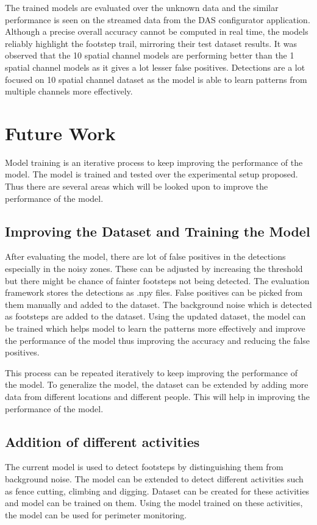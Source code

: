 The trained models are evaluated over the unknown data and the similar performance is seen on the streamed data from the DAS configurator application. Although a precise overall accuracy cannot be computed in real time, the models reliably highlight the footstep trail, mirroring their test dataset results. It was observed that the 10 spatial channel models are performing better than the 1 spatial channel models as it gives a lot lesser false positives. Detections are a lot focused on 10 spatial channel dataset as the model is able to learn patterns from multiple channels more effectively.

\section{Future Work}

Model training is an iterative process to keep improving the performance of the model. The model is trained and tested over the experimental setup proposed. Thus there are several areas which will be looked upon to improve the performance of the model.

\subsection{Improving the Dataset and Training the Model}
After evaluating the model, there are lot of false positives in the detections especially in the noisy zones. These can be adjusted by increasing the threshold but there might be chance of fainter footsteps not being detected. The evaluation framework stores the detections as .npy files. False positives can be picked from them manually and added to the dataset. The background noise which is detected as footsteps are added to the dataset. Using the updated dataset, the model can be trained which helps model to learn the patterns more effectively and improve the performance of the model thus improving the accuracy and reducing the false positives. 

This process can be repeated iteratively to keep improving the performance of the model. To generalize the model, the dataset can be extended by adding more data from different locations and different people. This will help in improving the performance of the model.

\subsection{Addition of different activities}
The current model is used to detect footsteps by distinguishing them from background noise. The model can be extended to detect different activities such as fence cutting, climbing and digging. Dataset can be created for these activities and model can be trained on them. Using the model trained on these activities, the model can be used for perimeter monitoring. 

